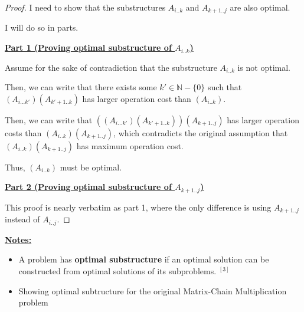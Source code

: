 \documentclass[12pt]{article}
\begin{document}
\begin{enumerate}[1.]
\begin{proof}
        \bigskip

        I need to show that the substructures $A_{i..k}$ and $A_{k+1..j}$ are also optimal.

        \bigskip

        I will do so in parts.

        \bigskip

        \underline{\textbf{Part 1 (Proving optimal substructure of $A_{i..k}$)}}

        \bigskip

        Assume for the sake of contradiction that the substructure $A_{i..k}$ is
        not optimal.

        \bigskip

        Then, we can write that there exists some $k' \in \mathbb{N} - \{0\}$ such that
        $(A_{i...k'})(A_{k'+1..k})$ has larger operation cost than $(A_{i..k})$.

        \bigskip

        Then, we can write that $((A_{i...k'})(A_{k'+1..k}))(A_{k+1..j})$ has larger
        operation costs than $(A_{i..k})(A_{k+1..j})$, which contradicts the original assumption that
        $(A_{i..k})(A_{k+1..j})$ has maximum operation cost.

        \bigskip

        Thus, $(A_{i..k})$ must be optimal.


        \bigskip

        \underline{\textbf{Part 2 (Proving optimal substructure of $A_{k+1..j}$)}}

        \bigskip

        This proof is nearly verbatim as part 1, where the only difference is using $A_{k+1..j}$
        instead of $A_{i..j}$.
    \end{proof}

    \bigskip

    \underline{\textbf{Notes:}}

    \bigskip

    \begin{itemize}
        \item A problem has \textbf{optimal substructure} if an optimal solution
        can be constructed from optimal solutions of its subproblems. $^{[3]}$

        \item Showing optimal subtructure for the original Matrix-Chain Multiplication problem

        \bigskip


\end{itemize}
\end{enumerate}
\end{document}
